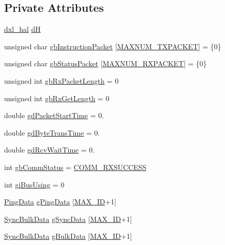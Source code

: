 \subsection*{Private Attributes}
\begin{DoxyCompactItemize}
\item 
\hyperlink{classdxl__hal}{dxl\+\_\+hal} \hyperlink{classdynamixel_ae003cc90ada6d7b70eaa4ea9d42d4deb}{d\+H}
\item 
unsigned char \hyperlink{classdynamixel_afd94dcf01b8e96298727776e222de722}{gb\+Instruction\+Packet} \mbox{[}\hyperlink{dxl__hal_8h_ad753363487043da5d9fdd3fd1071f59e}{M\+A\+X\+N\+U\+M\+\_\+\+T\+X\+P\+A\+C\+K\+E\+T}\mbox{]} = \{0\}
\item 
unsigned char \hyperlink{classdynamixel_aa57c86d3bbbeaf5c9d4f6bd00376b04f}{gb\+Status\+Packet} \mbox{[}\hyperlink{dxl__hal_8h_a37d5ce8f0a9ee058fa9674502c6a8b3a}{M\+A\+X\+N\+U\+M\+\_\+\+R\+X\+P\+A\+C\+K\+E\+T}\mbox{]} = \{0\}
\item 
unsigned int \hyperlink{classdynamixel_a333686e1b5903d16c41df8172b6bd5a8}{gb\+Rx\+Packet\+Length} = 0
\item 
unsigned int \hyperlink{classdynamixel_a9d590ce24791d111c2db9b66be1e046d}{gb\+Rx\+Get\+Length} = 0
\item 
double \hyperlink{classdynamixel_a6c6314fb7070e6fd361e57c5de17e0ec}{gd\+Packet\+Start\+Time} = 0.
\item 
double \hyperlink{classdynamixel_a2173f25c6299da7ddb37ba3d2bf1f738}{gd\+Byte\+Trans\+Time} = 0.
\item 
double \hyperlink{classdynamixel_a9f47887864517d74955a2bc787ae4456}{gd\+Rcv\+Wait\+Time} = 0.
\item 
int \hyperlink{classdynamixel_a5b603f6bed7ccc595f1f50bd6a6ebbfc}{gb\+Comm\+Status} = \hyperlink{dynamixel_8h_a171328d9f298535c18d079f65e631434}{C\+O\+M\+M\+\_\+\+R\+X\+S\+U\+C\+C\+E\+S\+S}
\item 
int \hyperlink{classdynamixel_ad10e0e49f5fef04bf789a89c14cc470a}{gi\+Bus\+Using} = 0
\item 
\hyperlink{dynamixel_8h_ac9fd59581222be7f70502a24c1f2260d}{Ping\+Data} \hyperlink{classdynamixel_a383bdc8f02ec1b5999f6eee94fff9ab0}{g\+Ping\+Data} \mbox{[}\hyperlink{dynamixel_8h_a1cdef4472847c938fc165b7d2737c4e4}{M\+A\+X\+\_\+\+I\+D}+1\mbox{]}
\item 
\hyperlink{dynamixel_8h_a8add985a0a86464eeca56e82ecda62d7}{Sync\+Bulk\+Data} \hyperlink{classdynamixel_ae3f2d0b8c800b9e89271189acb4d484c}{g\+Sync\+Data} \mbox{[}\hyperlink{dynamixel_8h_a1cdef4472847c938fc165b7d2737c4e4}{M\+A\+X\+\_\+\+I\+D}+1\mbox{]}
\item 
\hyperlink{dynamixel_8h_a8add985a0a86464eeca56e82ecda62d7}{Sync\+Bulk\+Data} \hyperlink{classdynamixel_a953aee387e1b1a919be73017a368c777}{g\+Bulk\+Data} \mbox{[}\hyperlink{dynamixel_8h_a1cdef4472847c938fc165b7d2737c4e4}{M\+A\+X\+\_\+\+I\+D}+1\mbox{]}
\end{DoxyCompactItemize}


